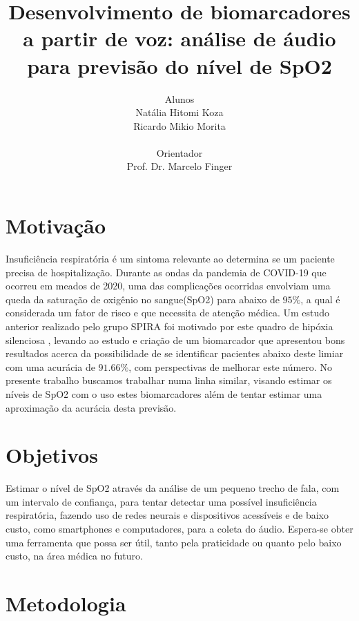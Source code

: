\documentclass[12pt, a4paper]{article}
\begin{document}
\title{Desenvolvimento de biomarcadores a partir de voz: análise de áudio para previsão do nível de SpO2}

\author{Alunos\\ Natália Hitomi Koza \\ Ricardo Mikio Morita \\ \\Orientador\\ Prof. Dr. Marcelo Finger}
\maketitle

\section{Motivação}

Insuficiência respiratória é um sintoma relevante ao determina se um paciente precisa de hospitalização. Durante as ondas da pandemia de COVID-19 que ocorreu em meados de 2020, uma das complicações ocorridas envolviam uma queda da saturação de oxigênio no sangue(SpO2) para abaixo de $95\%$, a qual é considerada um fator de risco e que necessita de atenção médica\cite{manualcovid}. Um estudo anterior realizado pelo grupo SPIRA foi motivado por este quadro de hipóxia silenciosa \citep{casanova2021deep}, levando ao estudo e criação de um biomarcador que apresentou bons resultados acerca da possibilidade de se identificar pacientes abaixo deste limiar com uma acurácia de $91.66\%$, com perspectivas de melhorar este número. No presente trabalho buscamos trabalhar numa linha similar, visando estimar os níveis de SpO2 com o uso estes biomarcadores além de tentar estimar uma aproximação da acurácia desta previsão.


\section{Objetivos}

Estimar o nível de SpO2 através da análise de um pequeno trecho de fala, com um intervalo de confiança, para tentar detectar uma possível insuficiência respiratória, fazendo uso de redes neurais e dispositivos acessíveis e de baixo custo, como smartphones e computadores, para a coleta do áudio. Espera-se obter uma ferramenta que possa ser útil, tanto pela praticidade ou quanto pelo baixo custo, na área médica no futuro.

\section{Metodologia}
\end{document}
